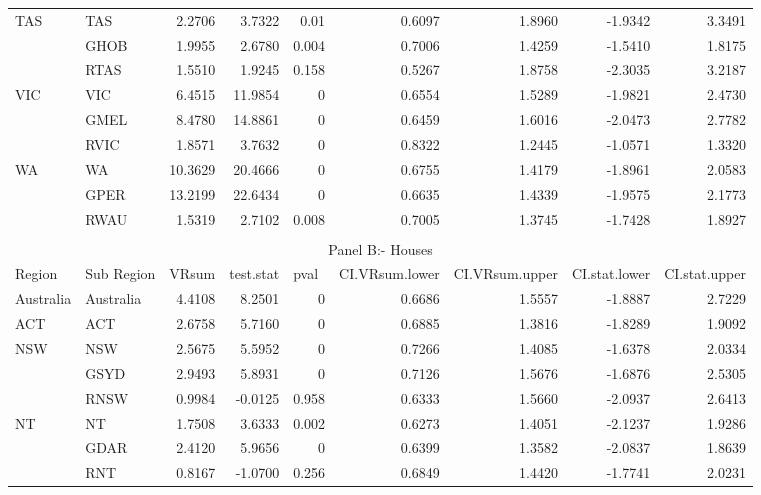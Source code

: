 \begin{table}[htbp]
{\begin{tabular}{llrrrrrrr}
    \multirow{3}[0]{*}{TAS} & TAS   & 2.2706 & 3.7322 & 0.01  & 0.6097 & 1.8960 & -1.9342 & 3.3491 \\
          & GHOB  & 1.9955 & 2.6780 & 0.004 & 0.7006 & 1.4259 & -1.5410 & 1.8175 \\
          & RTAS  & 1.5510 & 1.9245 & 0.158 & 0.5267 & 1.8758 & -2.3035 & 3.2187 \\
    \multirow{3}[0]{*}{VIC} & VIC   & 6.4515 & 11.9854 & 0     & 0.6554 & 1.5289 & -1.9821 & 2.4730 \\
          & GMEL  & 8.4780 & 14.8861 & 0     & 0.6459 & 1.6016 & -2.0473 & 2.7782 \\
          & RVIC  & 1.8571 & 3.7632 & 0     & 0.8322 & 1.2445 & -1.0571 & 1.3320 \\
    \multirow{3}[1]{*}{WA} & WA    & 10.3629 & 20.4666 & 0     & 0.6755 & 1.4179 & -1.8961 & 2.0583 \\
          & GPER  & 13.2199 & 22.6434 & 0     & 0.6635 & 1.4339 & -1.9575 & 2.1773 \\
          & RWAU  & 1.5319 & 2.7102 & 0.008 & 0.7005 & 1.3745 & -1.7428 & 1.8927 \\
    \midrule \\
    \multicolumn{9}{c}{Panel B:- Houses} \\
    \midrule
    Region & Sub Region & \multicolumn{1}{l}{VRsum} & \multicolumn{1}{l}{test.stat} & \multicolumn{1}{l}{pval} & \multicolumn{1}{l}{CI.VRsum.lower} & \multicolumn{1}{l}{CI.VRsum.upper} & \multicolumn{1}{l}{CI.stat.lower} & \multicolumn{1}{l}{CI.stat.upper} \\
    \midrule
    Australia & Australia & 4.4108 & 8.2501 & 0     & 0.6686 & 1.5557 & -1.8887 & 2.7229 \\
    ACT   & ACT   & 2.6758 & 5.7160 & 0     & 0.6885 & 1.3816 & -1.8289 & 1.9092 \\
    \multirow{3}[0]{*}{NSW} & NSW   & 2.5675 & 5.5952 & 0     & 0.7266 & 1.4085 & -1.6378 & 2.0334 \\
          & GSYD  & 2.9493 & 5.8931 & 0     & 0.7126 & 1.5676 & -1.6876 & 2.5305 \\
          & RNSW  & 0.9984 & -0.0125 & 0.958 & 0.6333 & 1.5660 & -2.0937 & 2.6413 \\
    \multirow{3}[0]{*}{NT} & NT    & 1.7508 & 3.6333 & 0.002 & 0.6273 & 1.4051 & -2.1237 & 1.9286 \\
          & GDAR  & 2.4120 & 5.9656 & 0     & 0.6399 & 1.3582 & -2.0837 & 1.8639 \\
          & RNT   & 0.8167 & -1.0700 & 0.256 & 0.6849 & 1.4420 & -1.7741 & 2.0231 \\

\end{tabular}}
\end{table}
